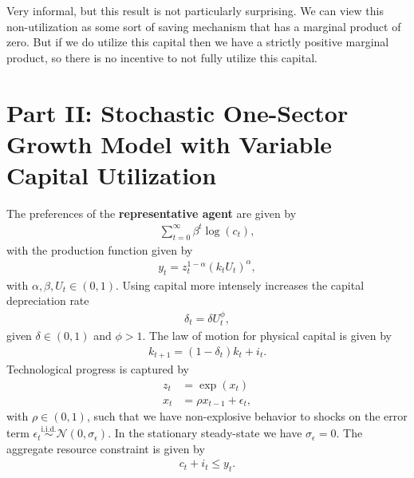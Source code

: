 \documentclass[a4paper]{article}
\theoremstyle{definition}
\begin{document}
Very informal, but this result is not particularly surprising. We can view this non-utilization as some sort of saving mechanism that has a marginal product of zero. But if we do utilize this capital then we have a strictly positive marginal product, so there is no incentive to not fully utilize this capital.
%
%
%
%
%
%
%
%
%
%
%
%
%
\newpage
\section{Part II: Stochastic One-Sector Growth Model with Variable Capital Utilization}
The preferences of the \textbf{representative agent} are given by
	\begin{align*}
	\sum\limits_{t=0}^{\infty} \beta^t \log(c_t) ,
	\end{align*} 
with the production function given by
	\begin{align*}
	y_t = z_t^{1-\alpha}(k_t U_t)^\alpha,
	\end{align*}	
with $\alpha,\beta,U_t \in (0,1)$. Using capital more intensely increases the capital depreciation rate
	\begin{align*}
	\delta_t = \delta U_t^\phi,
	\end{align*}	
given $\delta \in (0,1)$ and $\phi > 1$. The law of motion for physical capital is given by
	\begin{align*}
	k_{t+1} = (1-\delta_t)k_t + i_t.
	\end{align*}	
Technological progress is captured by
	\begin{align*}
	z_t 	&= \exp (x_t) \\
	x_t 	&= \rho x_{t-1} + \epsilon_t,
	\end{align*}	
with $\rho \in (0,1)$, such that we have non-explosive behavior to shocks on the error term $\epsilon_t \overset{\text{i.i.d.}}{\sim} \mathcal N(0,\sigma_\epsilon)$. In the stationary steady-state we have $\sigma_\epsilon = 0$. The aggregate resource constraint is given by
	\begin{align*}
	c_t + i_t \leq y_t.
	\end{align*}
\end{document}
